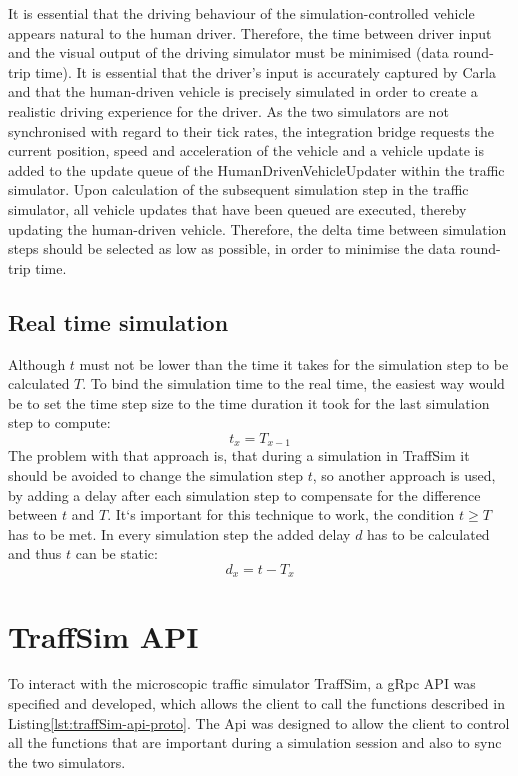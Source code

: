         It is essential that the driving behaviour of the simulation-controlled vehicle appears natural to the human driver.
        Therefore, the time between driver input and the visual output of the driving simulator must be minimised (data round-trip time).
        It is essential that the driver's input is accurately captured by Carla and that the human-driven vehicle is precisely simulated in order to create a realistic driving experience for the driver.
        As the two simulators are not synchronised with regard to their tick rates, the integration bridge requests the current position, speed and acceleration of the vehicle and a vehicle update is added to the update queue of the HumanDrivenVehicleUpdater within the traffic simulator.
        Upon calculation of the subsequent simulation step in the traffic simulator, all vehicle updates that have been queued are executed, thereby updating the human-driven vehicle.
        Therefore, the delta time between simulation steps should be selected as low as possible, in order to minimise the data round-trip time.


    \subsection{Real time simulation}\label{subsec:real-time-simulation}
        Although $t$ must not be lower than the time it takes for the simulation step to be calculated $T$.
        To bind the simulation time to the real time, the easiest way would be to set the time step size to the time duration it took for the last simulation step to compute:
        \[
            t_{x} = T_{x-1}
        \]
        The problem with that approach is, that during a simulation in TraffSim it should be avoided to change the simulation step $t$, so another approach is used, by adding a delay after each simulation step to compensate for the difference between $t$ and $T$.
        It`s important for this technique to work, the condition $t \geq T$ has to be met.
        In every simulation step the added delay $d$ has to be calculated and thus $t$ can be static:
        \[
            d_{x} = t - T_x
        \]

\section{TraffSim API}\label{sec:traffsim-api}
    To interact with the microscopic traffic simulator TraffSim, a gRpc\cite{wang1993grpc} API was specified and developed, which allows the client to call the functions described in Listing\ref{lst:traffSim-api-proto}.
    The Api was designed to allow the client to control all the functions that are important during a simulation session and also to sync the two simulators.


